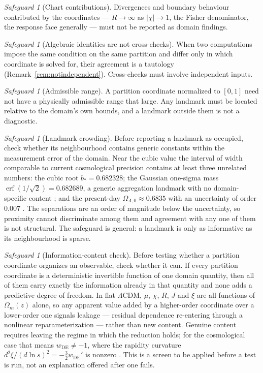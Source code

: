 \documentclass[11pt,a4paper]{article}
\theoremstyle{definition}
\theoremstyle{plain}
\theoremstyle{remark}
\newtheorem{safeguard}[definition]{Safeguard}
\newcommand{\Rresp}{R}
\begin{document}
\begin{safeguard}[Chart contributions]
Divergences and boundary behaviour contributed by the coordinates ---
$\Rresp\to\infty$ as $|\chi|\to1$, the Fisher denominator, the response face
generally --- must not be reported as domain findings.
\end{safeguard}

\begin{safeguard}[Algebraic identities are not cross-checks]
When two computations impose the same condition on the same partition and
differ only in which coordinate is solved for, their agreement is a tautology
(Remark~\ref{rem:notindependent}). Cross-checks must involve independent
inputs.
\end{safeguard}

\begin{safeguard}[Admissible range]
A partition coordinate normalized to $[0,1]$ need not have a physically
admissible range that large. Any landmark must be located relative to the
domain's own bounds, and a landmark outside them is not a diagnostic.
\end{safeguard}

\begin{safeguard}[Landmark crowding]
\label{safe:crowding}
Before reporting a landmark as occupied, check whether its neighbourhood
contains generic constants within the measurement error of the domain. Near the
cubic value the interval of width comparable to current cosmological precision
contains at least three unrelated numbers: the cubic root
$b_{*}=0.682328$; the Gaussian one-sigma mass
$\operatorname{erf}(1/\sqrt2)=0.682689$, a generic aggregation landmark with no
domain-specific content \cite{NormNulls}; and the present-day
$\Omega_{\Lambda,0}\approx 0.6835$ with an uncertainty of order $0.007$
\cite{Planck18,PartitionFlow}. The separations are an order of magnitude below
the uncertainty, so proximity cannot discriminate among them and agreement with
any one of them is not structural. The safeguard is general: a landmark is only
as informative as its neighbourhood is sparse.
\end{safeguard}

\begin{safeguard}[Information-content check]
\label{safe:infocontent}
Before testing whether a partition coordinate organizes an observable, check
whether it can. If every partition coordinate is a deterministic invertible
function of one domain quantity, then all of them carry exactly the information
already in that quantity and none adds a predictive degree of freedom. In flat
$\Lambda$CDM, $\mu$, $\chi$, $R$, $J$ and $\xi$ are all functions of
$\Omega_{m}(z)$ alone, so any apparent value added by a higher-order coordinate
over a lower-order one signals leakage --- residual dependence re-entering
through a nonlinear reparameterization --- rather than new content. Genuine
content requires leaving the regime in which the reduction holds; for the
cosmological case that means $w_{\mathrm{DE}}\neq-1$, where the rapidity
curvature $d^{2}\xi/(d\ln s)^{2}=-\tfrac32 w_{\mathrm{DE}}'$ is nonzero
\cite{PartitionFlow}. This is a screen to be applied before a test is run, not
an explanation offered after one fails.
\end{safeguard}
\end{document}
